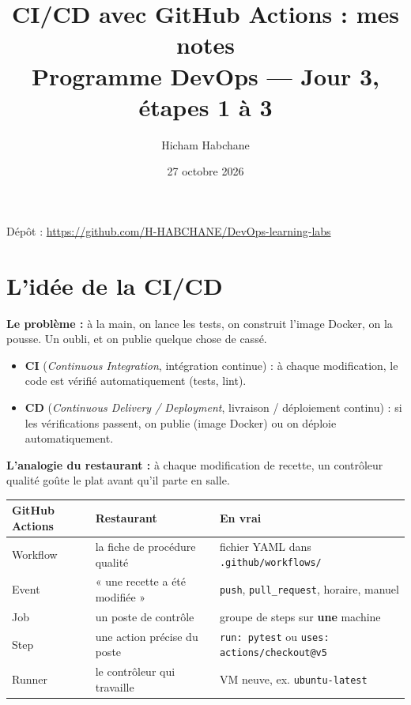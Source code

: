 \documentclass[11pt,a4paper]{article}
\title{\textbf{\textcolor{bleu}{CI/CD avec GitHub Actions : mes notes}}\\[4pt]
\large Programme DevOps --- Jour 3, étapes 1 à 3}
\author{Hicham Habchane}
\date{27 octobre 2026}
\newcommand{\cmd}[1]{\texttt{#1}}
\begin{document}
\maketitle
\thispagestyle{empty}

\begin{center}
Dépôt : \url{https://github.com/H-HABCHANE/DevOps-learning-labs}
\end{center}

\tableofcontents
\newpage

\section{L'idée de la CI/CD}

\textbf{Le problème :} à la main, on lance les tests, on construit l'image Docker, on la pousse. Un oubli, et on publie quelque chose de cassé.

\begin{itemize}
  \item \textbf{CI} (\emph{Continuous Integration}, intégration continue) : à chaque modification, le code est vérifié automatiquement (tests, lint).
  \item \textbf{CD} (\emph{Continuous Delivery / Deployment}, livraison / déploiement continu) : si les vérifications passent, on publie (image Docker) ou on déploie automatiquement.
\end{itemize}

\textbf{L'analogie du restaurant :} à chaque modification de recette, un contrôleur qualité goûte le plat avant qu'il parte en salle.

\begin{center}
\begin{tabularx}{\linewidth}{@{}l X l@{}}
\toprule
\textbf{GitHub Actions} & \textbf{Restaurant} & \textbf{En vrai} \\
\midrule
Workflow & la fiche de procédure qualité & fichier YAML dans \cmd{.github/workflows/} \\
Event & « une recette a été modifiée » & \cmd{push}, \cmd{pull\_request}, horaire, manuel \\
Job & un poste de contrôle & groupe de steps sur \textbf{une} machine \\
Step & une action précise du poste & \cmd{run: pytest} ou \cmd{uses: actions/checkout@v5} \\
Runner & le contrôleur qui travaille & VM neuve, ex. \cmd{ubuntu-latest} \\
\bottomrule
\end{tabularx}
\end{center}
\end{document}
